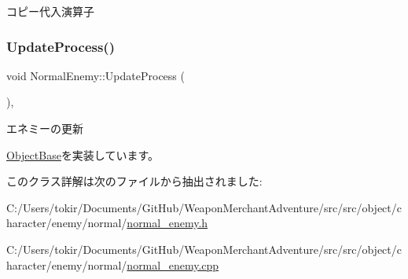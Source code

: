 コピー代入演算子 

\mbox{\label{class_normal_enemy_a9f66e4bf18310ec7c5dc679bea78fa8e}} 
\subsubsection{\texorpdfstring{Update\+Process()}{UpdateProcess()}}
{\footnotesize\ttfamily void Normal\+Enemy\+::\+Update\+Process (\begin{DoxyParamCaption}{ }\end{DoxyParamCaption})\hspace{0.3cm}{\ttfamily [protected]}, {\ttfamily [virtual]}}



エネミーの更新 



\mbox{\hyperlink{class_object_base_a8b5b72b363a419767efde0b0e692ea95}{Object\+Base}}を実装しています。



このクラス詳解は次のファイルから抽出されました\+:\begin{DoxyCompactItemize}
\item 
C\+:/\+Users/tokir/\+Documents/\+Git\+Hub/\+Weapon\+Merchant\+Adventure/src/src/object/character/enemy/normal/\mbox{\hyperlink{normal__enemy_8h}{normal\+\_\+enemy.\+h}}\item 
C\+:/\+Users/tokir/\+Documents/\+Git\+Hub/\+Weapon\+Merchant\+Adventure/src/src/object/character/enemy/normal/\mbox{\hyperlink{normal__enemy_8cpp}{normal\+\_\+enemy.\+cpp}}\end{DoxyCompactItemize}
